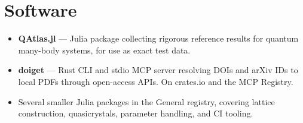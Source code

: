 \documentclass[11pt]{article}
\begin{document}
\section{Software}
\begin{itemize}
	\item \textbf{QAtlas.jl} --- Julia package collecting rigorous reference results for quantum many-body systems, for use as exact test data.
	\item \textbf{doiget} --- Rust CLI and stdio MCP server resolving DOIs and arXiv IDs to local PDFs through open-access APIs. On crates.io and the MCP Registry.
	\item Several smaller Julia packages in the General registry, covering lattice construction, quasicrystals, parameter handling, and CI tooling.
\end{itemize}
\end{document}
